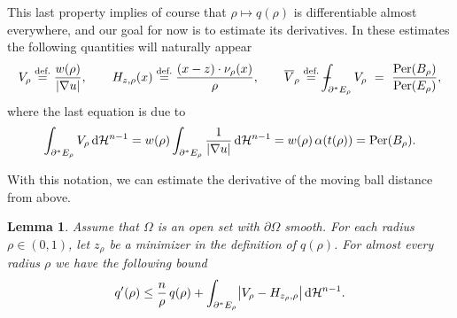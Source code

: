 \documentclass[11pt]{amsart}
\newcommand{\lemmname}{Lemma}
\theoremstyle{plain}
\newtheorem{lemma}[theorem]{\lemmname}
\theoremstyle{definition}
\def\Xint#1{\mathchoice{\XXint\displaystyle\textstyle{#1}}%
  {\XXint\textstyle\scriptstyle{#1}}%
  {\XXint\scriptstyle\scriptscriptstyle{#1}}%
  {\XXint\scriptscriptstyle\scriptscriptstyle{#1}}%
  \!\int}
\def\XXint#1#2#3{{\setbox0=\hbox{$#1{#2#3}{\int}$}
  \vcenter{\hbox{$#2#3$}}\kern-.5\wd0}}
\def\fint{\Xint-}
\newcommand{\dHn}{\,\dd\mathcal{H}^{n-1}}
\newcommand{\eqdef}{\overset{\text{def.}}{=}}
\def\dd{{\rm d}}
\newcommand\Per{\mathop{\rm Per}}
\begin{document}
This last property implies of course that $\rho \mapsto q(\rho)$ is differentiable almost everywhere, and our goal for now is to estimate its derivatives. In these estimates the following quantities will naturally appear
\begin{equation}\label{eq.velocity_normals}
    V_\rho\eqdef\frac{w(\rho)}{|\nabla u|},\qquad
    H_{z,\rho}(x)\eqdef\frac{(x-z)\cdot\nu_\rho(x)}{\rho},\qquad
    \overline{V}_\rho\eqdef\fint_{\partial^*E_\rho}V_\rho\ =\ \frac{\Per(B_\rho)}{\Per(E_\rho)},
\end{equation}
where the last equation is due to
\[
  \int_{\partial^*E_\rho}V_\rho\dHn=w(\rho)\int_{\partial^*E_\rho}\frac{1}{|\nabla u|}\dHn
  =w(\rho)\,\alpha(t(\rho))=\Per(B_\rho).
\]


With this notation, we can estimate the derivative of the moving ball distance from above.
\begin{lemma}\label{lemma.estimate_moving_ball_derivative}
  Assume that $\Omega$ is an open set with $\partial \Omega$ smooth.
  For each radius $\rho \in (0,1)$, let $z_\rho$ be a minimizer in the definition of $q(\rho)$. For almost every radius $\rho$ we have the following bound 
  \begin{equation}\label{eq.estimate_dev_q}
    q'(\rho) \le \frac{n}{\rho}\,q(\rho)
    +\int_{\partial^*E_\rho}\bigl|V_\rho-H_{z_\rho,\rho}\bigr|\dHn.
  \end{equation}
\end{lemma}
\end{document}
